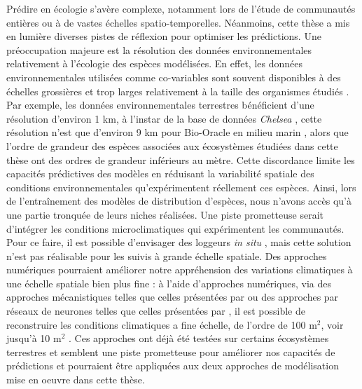 \begin{refsection}
Prédire en écologie s'avère complexe, notamment lors de l'étude de
communautés entières ou à de vastes échelles spatio-temporelles.
Néanmoins, cette thèse a mis en lumière diverses pistes de réflexion
pour optimiser les prédictions. Une préoccupation majeure est la
résolution des données environnementales relativement à l'écologie des
espèces modélisées. En effet, les données environnementales utilisées
comme co-variables sont souvent disponibles à des échelles grossières et
trop larges relativement à la taille des organismes étudiés
\autocite{Potter_2013}. Par exemple, les données environnementales
terrestres bénéficient d'une résolution d'environ 1 km, à l'instar de la
base de données \emph{Chelsea} \autocite{Karger_2017}, cette résolution
n'est que d'environ 9 km pour Bio-Oracle en milieu marin
\autocite{Assis_2018}, alors que l'ordre de grandeur des espèces
associées aux écosystèmes étudiées dans cette thèse ont des ordres de
grandeur inférieurs au mètre. Cette discordance limite les capacités
prédictives des modèles en réduisant la variabilité spatiale des
conditions environnementales qu'expérimentent réellement ces espèces.
Ainsi, lors de l'entraînement des modèles de distribution d'espèces,
nous n'avons accès qu'à une partie tronquée de leurs niches réalisées.
Une piste prometteuse serait d'intégrer les conditions microclimatiques
qui expérimentent les communautés. Pour ce faire, il est possible
d'envisager des loggeurs \emph{in situ} \autocite{Lembrechts_2019}, mais
cette solution n'est pas réalisable pour les suivis à grande échelle
spatiale. Des approches numériques pourraient améliorer notre
appréhension des variations climatiques à une échelle spatiale bien plus
fine : à l'aide d'approches numériques, via des approches mécanistiques
telles que celles présentées par \textcite{Maclean_2019} ou des
approches par réseaux de neurones telles que celles présentées par
\textcite{Hu_2023}, il est possible de reconstruire les conditions
climatiques a fine échelle, de l'ordre de 100 m$^{2}$, voir jusqu'à 10
m$^{2}$ \autocite{Maclean_2020}. Ces approches ont déjà été testées sur
certains écosystèmes terrestres \autocite{Stark_2022} et semblent une
piste prometteuse pour améliorer nos capacités de prédictions
\autocite{Lembrechts_2020} et pourraient être appliquées aux deux
approches de modélisation mise en oeuvre dans cette thèse.


\end{refsection}
